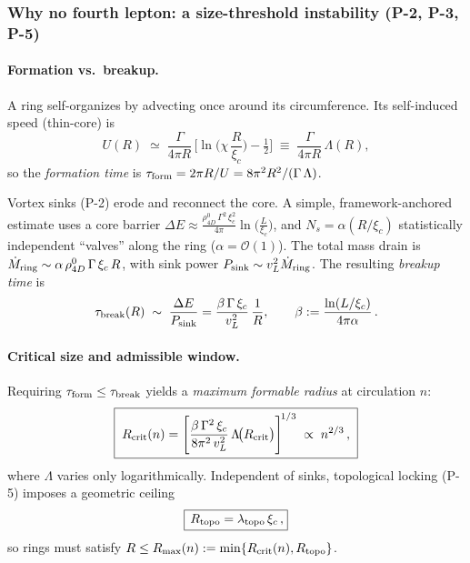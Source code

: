 \subsubsection{Why no fourth lepton: a size-threshold instability (P-2, P-3, P-5)}
\paragraph{Formation vs.\ breakup.}
A ring self-organizes by advecting once around its circumference. Its self-induced speed (thin-core) is
\begin{equation}
U(R)\;\simeq\;\frac{\Gamma}{4\pi R}\,\Big[\ln\!\Big(\chi\,\frac{R}{\xi_c}\Big)-\tfrac12\Big]
\;\equiv\;\frac{\Gamma}{4\pi R}\,\Lambda(R),
\label{eq:U}
\end{equation}
so the \emph{formation time} is \(\tau_{\rm form}=2\pi R/U=8\pi^2R^2/(\Gamma\,\Lambda)\).

Vortex sinks (P-2) erode and reconnect the core. A simple, framework-anchored estimate uses a core barrier
\(
\Delta E \approx \frac{\rho_{4D}^0\,\Gamma^2\,\xi_c^2}{4\pi}\ln\!\big(\tfrac{L}{\xi_c}\big)
\),
and \(N_s=\alpha(R/\xi_c)\) statistically independent ``valves'' along the ring (\(\alpha=\mathcal O(1)\)). The total mass drain is
\(
\dot M_{\rm ring}\sim \alpha\,\rho_{4D}^0\,\Gamma\,\xi_c\,R
\),
with sink power \(P_{\rm sink}\sim v_L^2\dot M_{\rm ring}\). The resulting \emph{breakup time} is
\begin{equation}
\tau_{\rm break}(R)\;\sim\;\frac{\Delta E}{P_{\rm sink}}
=\frac{\beta\,\Gamma\,\xi_c}{v_L^2}\,\frac{1}{R},\qquad
\beta:=\frac{\ln(L/\xi_c)}{4\pi\alpha}\,.
\label{eq:taubreak}
\end{equation}

\paragraph{Critical size and admissible window.}
Requiring \(\tau_{\rm form}\le\tau_{\rm break}\) yields a \emph{maximum formable radius} at circulation \(n\):
\begin{equation}
\boxed{\;
R_{\rm crit}(n)=\Bigg[\frac{\beta\,\Gamma^{2}\,\xi_c}{8\pi^{2}\,v_L^{2}}\,\Lambda\!\big(R_{\rm crit}\big)\Bigg]^{\!1/3}
\;\propto\; n^{2/3}\,,\;
}
\label{eq:Rcrit}
\end{equation}
where \(\Lambda\) varies only logarithmically. Independent of sinks, topological locking (P-5) imposes a geometric ceiling
\begin{equation}
\boxed{\,R_{\rm topo}=\lambda_{\rm topo}\,\xi_c\,,}
\label{eq:Rtopo}
\end{equation}
so rings must satisfy \(R\le R_{\max}(n):=\min\{R_{\rm crit}(n),R_{\rm topo}\}\).

